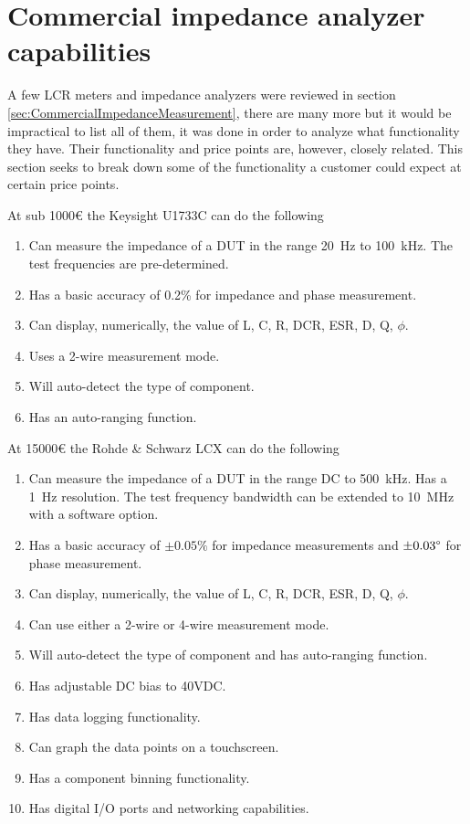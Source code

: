 \section{Commercial impedance analyzer capabilities} \label{sec:CommercialImpedanceAnalyzerCapabilities}
A few LCR meters and impedance analyzers were reviewed in section \ref{sec:CommercialImpedanceMeasurement}, there are many more but it would be impractical to list all of them, it was done in order to analyze what functionality they have. Their functionality and price points are, however, closely related. This section seeks to break down some of the functionality a customer could expect at certain price points.

At sub 1000€ the Keysight U1733C can do the following
\begin{enumerate}
  \item Can measure the impedance of a DUT in the range \SI[]{20}{\hertz} to \SI[]{100}{\kilo\hertz}. The test frequencies are pre-determined.
  \item Has a basic accuracy of 0.2\% for impedance and phase measurement.
  \item Can display, numerically, the value of L, C, R, DCR, ESR, D, Q, $\phi$.
  \item Uses a 2-wire measurement mode.
  \item Will auto-detect the type of component.
  \item Has an auto-ranging function.
\end{enumerate}

At 15000€ the Rohde \& Schwarz LCX can do the following
\begin{enumerate}
    \item Can measure the impedance of a DUT in the range DC to \SI[]{500}{\kilo\hertz}. Has a \SI[]{1}{\hertz} resolution. The test frequency bandwidth can be extended to \SI[]{10}{\mega\hertz} with a software option.
    \item Has a basic accuracy of $\pm 0.05\%$ for impedance measurements and $\pm 0.03\degree$ for phase measurement.
    \item Can display, numerically, the value of L, C, R, DCR, ESR, D, Q, $\phi$.
    \item Can use either a 2-wire or 4-wire measurement mode.
    \item Will auto-detect the type of component and has auto-ranging function.
    \item Has adjustable DC bias to 40VDC.
    \item Has data logging functionality.
    \item Can graph the data points on a touchscreen.
    \item Has a component binning functionality.
    \item Has digital I/O ports and networking capabilities.
  \end{enumerate}


